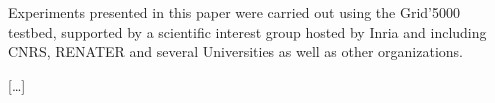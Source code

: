 

Experiments presented in this paper were carried out using the \mbox{Grid'5000}
testbed, supported by a scientific interest group hosted by \mbox{Inria} and including
\mbox{CNRS}, \mbox{RENATER} and several Universities as well as other organizations.

\begin{otherlanguage}{french}

[\dots]

\end{otherlanguage}
